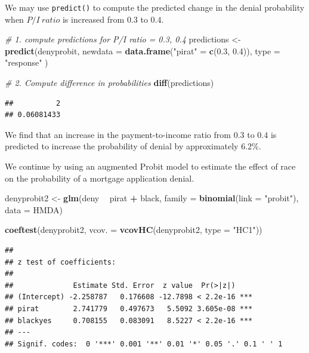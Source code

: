 \documentclass[]{book}
\newenvironment{Shaded}{\begin{snugshade}}{\end{snugshade}}
\newcommand{\KeywordTok}[1]{\textcolor[rgb]{0.13,0.29,0.53}{\textbf{#1}}}
\newcommand{\DataTypeTok}[1]{\textcolor[rgb]{0.13,0.29,0.53}{#1}}
\newcommand{\FloatTok}[1]{\textcolor[rgb]{0.00,0.00,0.81}{#1}}
\newcommand{\StringTok}[1]{\textcolor[rgb]{0.31,0.60,0.02}{#1}}
\newcommand{\CommentTok}[1]{\textcolor[rgb]{0.56,0.35,0.01}{\textit{#1}}}
\newcommand{\OperatorTok}[1]{\textcolor[rgb]{0.81,0.36,0.00}{\textbf{#1}}}
\newcommand{\NormalTok}[1]{#1}
\theoremstyle{definition}
\theoremstyle{definition}
\theoremstyle{definition}
\theoremstyle{remark}
\begin{document}
We may use \texttt{predict()} to compute the predicted change in the
denial probability when \(P/I \ ratio\) is increased from \(0.3\) to
\(0.4\).

\begin{Shaded}
\begin{Highlighting}[]
\CommentTok{# 1. compute predictions for P/I ratio = 0.3, 0.4}
\NormalTok{predictions <-}\StringTok{ }\KeywordTok{predict}\NormalTok{(denyprobit, }
                       \DataTypeTok{newdata =} \KeywordTok{data.frame}\NormalTok{(}\StringTok{"pirat"}\NormalTok{ =}\StringTok{ }\KeywordTok{c}\NormalTok{(}\FloatTok{0.3}\NormalTok{, }\FloatTok{0.4}\NormalTok{)),}
                       \DataTypeTok{type =} \StringTok{"response"}
\NormalTok{                       )}

\CommentTok{# 2. Compute difference in probabilities}
\KeywordTok{diff}\NormalTok{(predictions)}
\end{Highlighting}
\end{Shaded}

\begin{verbatim}
##          2 
## 0.06081433
\end{verbatim}

We find that an increase in the payment-to-income ratio from \(0.3\) to
\(0.4\) is predicted to increase the probability of denial by
approximately \(6.2\%\).

We continue by using an augmented Probit model to estimate the effect of
race on the probability of a mortgage application denial.

\begin{Shaded}
\begin{Highlighting}[]
\NormalTok{denyprobit2 <-}\StringTok{ }\KeywordTok{glm}\NormalTok{(deny }\OperatorTok{~}\StringTok{ }\NormalTok{pirat }\OperatorTok{+}\StringTok{ }\NormalTok{black, }
                \DataTypeTok{family =} \KeywordTok{binomial}\NormalTok{(}\DataTypeTok{link =} \StringTok{"probit"}\NormalTok{), }
                \DataTypeTok{data =}\NormalTok{ HMDA)}

\KeywordTok{coeftest}\NormalTok{(denyprobit2, }\DataTypeTok{vcov. =} \KeywordTok{vcovHC}\NormalTok{(denyprobit2, }\DataTypeTok{type =} \StringTok{"HC1"}\NormalTok{))}
\end{Highlighting}
\end{Shaded}

\begin{verbatim}
## 
## z test of coefficients:
## 
##              Estimate Std. Error  z value  Pr(>|z|)    
## (Intercept) -2.258787   0.176608 -12.7898 < 2.2e-16 ***
## pirat        2.741779   0.497673   5.5092 3.605e-08 ***
## blackyes     0.708155   0.083091   8.5227 < 2.2e-16 ***
## ---
## Signif. codes:  0 '***' 0.001 '**' 0.01 '*' 0.05 '.' 0.1 ' ' 1
\end{verbatim}
\end{document}
